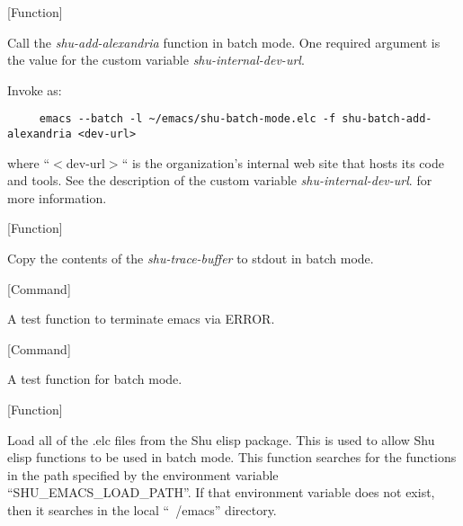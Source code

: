 \vspace{1em}
\noindent
{}
\usebox{\funcname}
 \hfill [Function]

\begin{doc-string}
Call the \emph{shu-add-alexandria} function in batch mode.  One required argument is
the value for the custom variable \emph{shu-internal-dev-url}.

Invoke as:

\small{\begin{verbatim}
     emacs --batch -l ~/emacs/shu-batch-mode.elc -f shu-batch-add-alexandria <dev-url>
\end{verbatim}}

where ``$<$dev-url$>$`` is the organization's internal web site that hosts its code
and tools.  See the description of the custom variable \emph{shu-internal-dev-url}.
for more information.
\end{doc-string}

\vspace{1em}
\noindent
{}
\usebox{\funcname}
 \hfill [Function]

\begin{doc-string}
Copy the contents of the \emph{shu-trace-buffer} to stdout in batch mode.
\end{doc-string}

\vspace{1em}
\noindent
{}
\usebox{\funcname}
 \hfill [Command]

\begin{doc-string}
A test function to terminate emacs via ERROR.
\end{doc-string}

\vspace{1em}
\noindent
{}
\usebox{\funcname}
 \hfill [Command]

\begin{doc-string}
A test function for batch mode.
\end{doc-string}

\vspace{1em}
\noindent
{}
\usebox{\funcname}
 \hfill [Function]

\begin{doc-string}
Load all of the .elc files from the Shu elisp package.  This is used to allow
Shu elisp functions to be used in batch mode.  This function searches for the
functions in the path specified by the environment variable
``SHU\_EMACS\_LOAD\_PATH''.  If that environment variable does not exist, then it
searches in the local ``~/emacs'' directory.
\end{doc-string}


